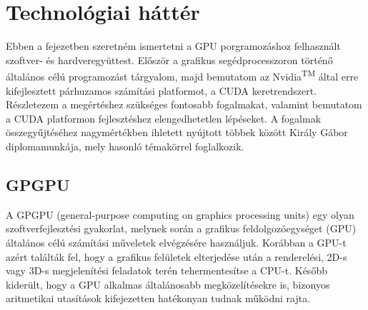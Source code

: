 \chapter{Technológiai háttér}
Ebben a fejezetben szeretném ismertetni a GPU porgramozáshoz felhasznált szoftver- és hardveregyüttest. Először a grafikus segédprocesszoron történő általános célú programozást tárgyalom, majd bemutatom az Nvidia\textsuperscript{TM} által erre kifejlesztett párhuzamos számítási platformot, a CUDA keretrendszert. Részletezem a megértéshez szükséges fontosabb fogalmakat, valamint bemutatom a CUDA platformon fejlesztéshez elengedhetetlen lépéseket. A fogalmak összegyűjtéséhez nagymértékben ihletett nyújtott többek között Király Gábor diplomamunkája, mely hasonló témakörrel foglalkozik. \cite{kvantum_optim}

\section{GPGPU}
A GPGPU (general-purpose computing on graphics processing units) egy olyan
szoftverfejlesztési gyakorlat, melynek során a grafikus feldolgozóegységet (GPU) általános
célú számítási műveletek elvégzésére használjuk. \cite{kvantum_optim} Korábban a GPU-t azért találták fel, hogy a grafikus felületek elterjedése után a renderelési, 2D-s vagy 3D-s megjelenítési feladatok terén tehermentesítse a CPU-t. Később kiderült, hogy a GPU alkalmas általánosabb megközelítésekre is, bizonyos aritmetikai utasítások kifejezetten hatékonyan tudnak működni rajta.

